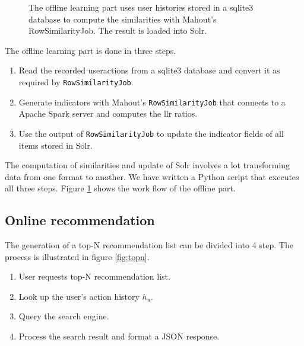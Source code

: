 \begin{figure}
\centering
{}
\caption{The offline learning part uses user histories stored in a sqlite3 database to compute the similarities with Mahout's {\ttfamily RowSimilarityJob}. The result is loaded into Solr.}
\label{fig:offline}
\end{figure}

The offline learning part is done in three steps.

\begin{enumerate}
\item Read the recorded \glspl{useraction} from a sqlite3 database and convert it as required by \verb|RowSimilarityJob|.
\item Generate \glspl{indicator} with Mahout's \verb|RowSimilarityJob| that connects to a Apache Spark server and computes the \gls{llr} ratios.
\item Use the output of \verb|RowSimilarityJob| to update the indicator fields of all items stored in Solr.
\end{enumerate}

The computation of similarities and update of Solr involves a lot transforming data from one format to another. We have written a Python script that executes all three steps. Figure \ref{fig:offline} shows the work flow of the offline part.

\subsection{Online recommendation}
\label{sec:online}

The generation of a top-N recommendation list can be divided into 4 step. The process is illustrated in figure \ref{fig:topn}.

\begin{enumerate}
\item User requests top-N recommendation list.
\item Look up the user's action history $h_u$.
\item Query the search engine.
\item Process the search result and format a JSON response.
\end{enumerate}

